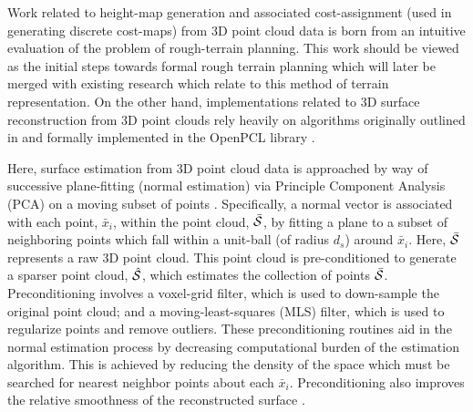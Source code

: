 		Work related to height-map generation and associated cost-assignment (used in generating discrete cost-maps) from 3D point cloud data is born from an intuitive evaluation of the problem of rough-terrain planning. This work should be viewed as the initial steps towards formal rough terrain planning which will later be merged with existing research which relate to this method of terrain representation. On the other hand, implementations related to 3D surface reconstruction from 3D point clouds rely heavily on algorithms originally outlined in \cite{Rusu2009} and formally implemented in the OpenPCL library \cite{openpcl_library}. 

		Here, surface estimation from 3D point cloud data is approached by way of successive plane-fitting (normal estimation) via Principle Component Analysis (PCA) on a moving subset of points \cite{Rusu2009,Pearson1901}. Specifically, a normal vector is associated with each point, $\bar{x}_{i}$, within the point cloud,  $\bar{{\cal S}}$,  by fitting a plane to a subset of neighboring points which fall within a unit-ball (of radius $d_{s}$) around $\bar{x}_{i}$. Here, $\bar{{\cal S}}$ represents a raw 3D point cloud. This point cloud is pre-conditioned to generate a sparser point cloud, $\hat{{\cal S}}$, which estimates the collection of points $\bar{{\cal S}}$. Preconditioning involves a voxel-grid filter, which is used to down-sample the original point cloud; and a moving-least-squares (MLS) filter, which is used to regularize points and remove outliers. These preconditioning routines aid in the normal estimation process by decreasing computational burden of the estimation algorithm. This is achieved by reducing the density of the space which must be searched for nearest neighbor points about each $\bar{x}_{i}$. Preconditioning also improves the relative smoothness of the reconstructed surface \cite{Rusu2009}. 

